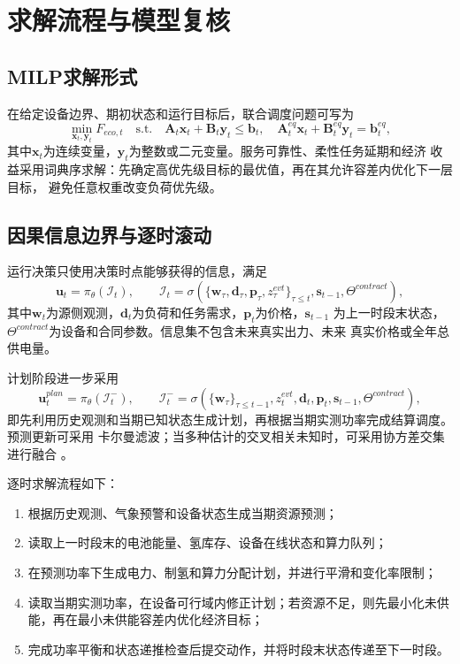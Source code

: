 \section{求解流程与模型复核}
\label{sec:solution}

\subsection{MILP求解形式}

在给定设备边界、期初状态和运行目标后，联合调度问题可写为
\begin{equation}
\min_{\bm x_t,\bm y_t} F_{eco,t}
\quad\mathrm{s.t.}\quad
\bm A_t\bm x_t+\bm B_t\bm y_t\le\bm b_t,
\quad
\bm A_t^{eq}\bm x_t+\bm B_t^{eq}\bm y_t=\bm b_t^{eq},
\label{eq:milp-compact}
\end{equation}
其中$\bm x_t$为连续变量，$\bm y_t$为整数或二元变量。服务可靠性、柔性任务延期和经济
收益采用词典序求解：先确定高优先级目标的最优值，再在其允许容差内优化下一层目标，
避免任意权重改变负荷优先级。

\subsection{因果信息边界与逐时滚动}

运行决策只使用决策时点能够获得的信息，满足
\begin{equation}
\bm u_t=\pi_\theta(\mathcal I_t),\qquad
\mathcal I_t=\sigma\!\left(
\{\bm w_\tau,\bm d_\tau,\bm p_\tau,z_\tau^{evt}\}_{\tau\le t},
\bm s_{t-1},\Theta^{contract}\right),
\label{eq:causal-policy}
\end{equation}
其中$\bm w_t$为源侧观测，$\bm d_t$为负荷和任务需求，$\bm p_t$为价格，$\bm s_{t-1}$
为上一时段末状态，$\Theta^{contract}$为设备和合同参数。信息集不包含未来真实出力、未来
真实价格或全年总供电量。

计划阶段进一步采用
\begin{equation}
\bm u_t^{plan}=\pi_\theta(\mathcal I_t^-),\qquad
\mathcal I_t^-=\sigma\!\left(
\{\bm w_\tau\}_{\tau\le t-1},z_t^{evt},\bm d_t,\bm p_t,
\bm s_{t-1},\Theta^{contract}\right),
\label{eq:causal-planning-policy}
\end{equation}
即先利用历史观测和当期已知状态生成计划，再根据当期实测功率完成结算调度。预测更新可采用
卡尔曼滤波\cite{kalman1960}；当多种估计的交叉相关未知时，可采用协方差交集进行融合
\cite{julier1997ci}。

逐时求解流程如下：
\begin{enumerate}[label=(\arabic*)]
\item 根据历史观测、气象预警和设备状态生成当期资源预测；
\item 读取上一时段末的电池能量、氢库存、设备在线状态和算力队列；
\item 在预测功率下生成电力、制氢和算力分配计划，并进行平滑和变化率限制；
\item 读取当期实测功率，在设备可行域内修正计划；若资源不足，则先最小化未供能，再在最小未供能容差内优化经济目标\cite{mavrotas2009}；
\item 完成功率平衡和状态递推检查后提交动作，并将时段末状态传递至下一时段。
\end{enumerate}

